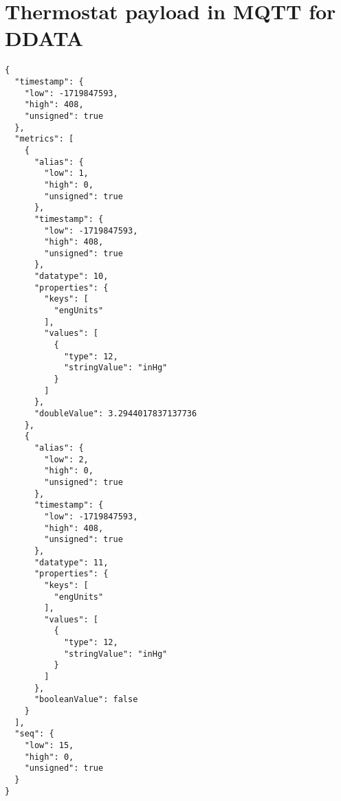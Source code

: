 \section{Thermostat payload in MQTT for DDATA}
\label{appendix:details-of-resultsddata}
\begin{verbatim}
{
  "timestamp": {
    "low": -1719847593,
    "high": 408,
    "unsigned": true
  },
  "metrics": [
    {
      "alias": {
        "low": 1,
        "high": 0,
        "unsigned": true
      },
      "timestamp": {
        "low": -1719847593,
        "high": 408,
        "unsigned": true
      },
      "datatype": 10,
      "properties": {
        "keys": [
          "engUnits"
        ],
        "values": [
          {
            "type": 12,
            "stringValue": "inHg"
          }
        ]
      },
      "doubleValue": 3.2944017837137736
    },
    {
      "alias": {
        "low": 2,
        "high": 0,
        "unsigned": true
      },
      "timestamp": {
        "low": -1719847593,
        "high": 408,
        "unsigned": true
      },
      "datatype": 11,
      "properties": {
        "keys": [
          "engUnits"
        ],
        "values": [
          {
            "type": 12,
            "stringValue": "inHg"
          }
        ]
      },
      "booleanValue": false
    }
  ],
  "seq": {
    "low": 15,
    "high": 0,
    "unsigned": true
  }
}
\end{verbatim}
